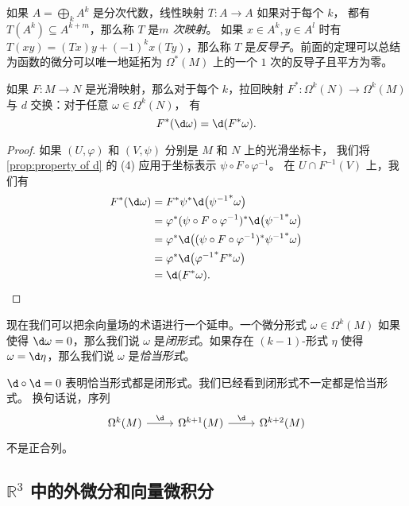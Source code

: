 如果 $A=\bigoplus_k A^k$ 是分次代数，线性映射 $T:A\to A$ 如果对于每个 $k$，
都有 $T(A^k)\subseteq A^{k+m}$，那么称 $T$ 是\emph{$m$ 次映射}。
如果 $x\in A^k,y\in A^l$ 时有 $T(xy)=(Tx)y+(-1)^kx(Ty)$，那么称
$T$ 是\emph{反导子}。前面的定理可以总结为函数的微分可以唯一地延拓为
$\Omega^*(M)$ 上的一个 $1$ 次的反导子且平方为零。

\begin{proposition}[外微分的自然性]
  如果 $F:M\to N$ 是光滑映射，那么对于每个 $k$，拉回映射
  $F^*:\Omega^k(N)\to\Omega^k(M)$ 与 $d$ 交换：对于任意 $\omega\in\Omega^k(N)$，
  有
  \begin{equation}\label{eq:naturality of d}
    F^*(\d\omega)=\d (F^*\omega).
  \end{equation}
\end{proposition}
\begin{proof}
  如果 $(U,\varphi)$ 和 $(V,\psi)$ 分别是 $M$ 和 $N$ 上的光滑坐标卡，
  我们将 \autoref{prop:property of d} 的 (4) 应用于坐标表示 $\psi\circ F\circ\varphi^{-1}$。
  在 $U\cap F^{-1}(V)$ 上，我们有
  \begin{align*}
    F^*(\d\omega)&=F^*\psi^*\d\bigl({\psi^{-1}}^*\omega\bigr)\\
    &=\varphi^*(\psi\circ F\circ\varphi^{-1})^*\d\bigl({\psi^{-1}}^*\omega\bigr)\\
    &=\varphi^*\d\bigl((\psi\circ F\circ\varphi^{-1})^*{\psi^{-1}}^*\omega\bigr)\\
    &=\varphi^*\d\bigl({\varphi^{-1}}^*F^*\omega\bigr)\\
    &=\d(F^*\omega).\qedhere
  \end{align*}
\end{proof}

现在我们可以把余向量场的术语进行一个延申。一个微分形式 $\omega\in\Omega^k(M)$
如果使得 $\d\omega=0$，那么我们说 $\omega$ 是\emph{闭形式}。如果存在
$(k-1)$-形式 $\eta$ 使得 $\omega=\d\eta$，那么我们说 $\omega$ 是\emph{恰当形式}。

$\d\circ\d =0$ 表明恰当形式都是闭形式。我们已经看到闭形式不一定都是恰当形式。
换句话说，序列
\[
  \begin{tikzcd}
    \Omega^k(M)\arrow[r,"\d"] & \Omega^{k+1}(M)\arrow[r,"\d"]
    & \Omega^{k+2}(M)
  \end{tikzcd}  
\]
不是正合列。

\subsection{$\mathbb{R}^3$ 中的外微分和向量微积分}


